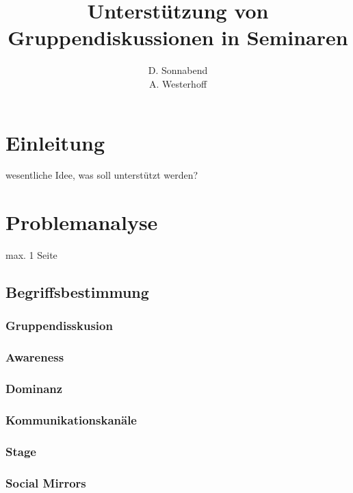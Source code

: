\documentclass{seminarvorlage}
\begin{document}
\title{Unterstützung von Gruppendiskussionen in Seminaren}
\author{
  \alignauthor D. Sonnabend\\
  \alignauthor A. Westerhoff\\
}

\maketitle



\section{Einleitung}
wesentliche Idee, was soll unterstützt werden?
\section{Problemanalyse}

max. 1 Seite
\subsection{Begriffsbestimmung}
\subsubsection{Gruppendisskusion}
\subsubsection{Awareness}
\subsubsection{Dominanz}
\subsubsection{Kommunikationskanäle}
\subsubsection{Stage}
\subsubsection{Social Mirrors}
\end{document}
